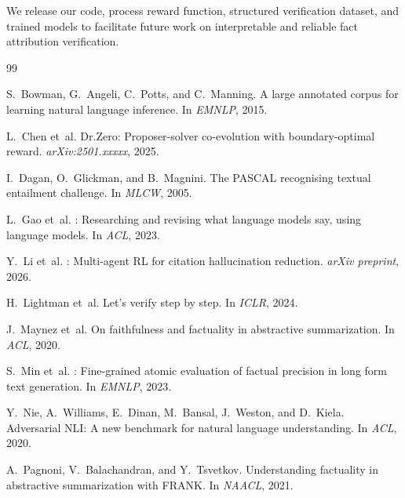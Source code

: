 \documentclass{article}
\begin{document}
We release our code, process reward function, structured verification dataset, and trained models to facilitate future work on interpretable and reliable fact attribution verification.



% 

\begin{thebibliography}{99}

S.~Bowman, G.~Angeli, C.~Potts, and C.~Manning.
\newblock A large annotated corpus for learning natural language inference.
\newblock In \emph{EMNLP}, 2015.

L.~Chen et~al.
\newblock Dr.Zero: Proposer-solver co-evolution with boundary-optimal reward.
\newblock \emph{arXiv:2501.xxxxx}, 2025.

I.~Dagan, O.~Glickman, and B.~Magnini.
\newblock The {PASCAL} recognising textual entailment challenge.
\newblock In \emph{MLCW}, 2005.

L.~Gao et~al.
: Researching and revising what language models say, using language models.
\newblock In \emph{ACL}, 2023.

Y.~Li et~al.
: Multi-agent RL for citation hallucination reduction.
\newblock \emph{arXiv preprint}, 2026.

H.~Lightman et~al.
\newblock Let's verify step by step.
\newblock In \emph{ICLR}, 2024.

J.~Maynez et~al.
\newblock On faithfulness and factuality in abstractive summarization.
\newblock In \emph{ACL}, 2020.

S.~Min et~al.
: Fine-grained atomic evaluation of factual precision in long form text generation.
\newblock In \emph{EMNLP}, 2023.

Y.~Nie, A.~Williams, E.~Dinan, M.~Bansal, J.~Weston, and D.~Kiela.
\newblock Adversarial {NLI}: A new benchmark for natural language understanding.
\newblock In \emph{ACL}, 2020.

A.~Pagnoni, V.~Balachandran, and Y.~Tsvetkov.
\newblock Understanding factuality in abstractive summarization with {FRANK}.
\newblock In \emph{NAACL}, 2021.


\end{thebibliography}
\end{document}

